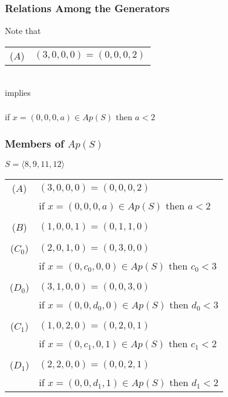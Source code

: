 \documentclass{beamer}
\begin{document}

\begin{frame}
\begin{center}
\frametitle{Relations Among the Generators}

Note that

{\footnotesize
\begin{center}
\begin{tabular}{cl}
($A$) & $\left(3, 0, 0, 0\right)=\left(0, 0, 0, 2\right)$\\
\end{tabular}
\end{center}
}

~\\

implies\\

~\\

if $x = \left(0, 0, 0, a\right) \in Ap(S)$ then $a < 2$

\end{center}
\end{frame}


\begin{frame}
\begin{center}
\frametitle{Members of $Ap(S)$}

$S = \langle 8, 9, 11, 12 \rangle$

{\footnotesize
\begin{center}
\begin{tabular}{cl}
($A$) & $\left(3, 0, 0, 0\right) = \left(0, 0, 0, 2\right)$\\
 & if $x = \left(0, 0, 0, a\right) \in Ap(S)$ then $a < 2$\\
 &\\
($B$) & $\left(1, 0, 0, 1\right) = \left(0, 1, 1, 0\right)$\\
 &\\
($C_0$) & $\left(2, 0, 1, 0\right) = \left(0, 3, 0, 0\right)$\\
 & if $x = \left(0, c_0, 0, 0\right) \in Ap(S)$ then $c_0 < 3$\\
 &\\
($D_0$) & $\left(3, 1, 0, 0\right) = \left(0, 0, 3, 0\right)$\\
 & if $x = \left(0, 0, d_0, 0\right) \in Ap(S)$ then $d_0 < 3$\\
 &\\
($C_1$) & $\left(1, 0, 2, 0\right) = \left(0, 2, 0, 1\right)$\\
 & if $x = \left(0, c_1, 0, 1\right) \in Ap(S)$ then $c_1 < 2$\\
 &\\
($D_1$) & $\left(2, 2, 0, 0\right) = \left(0, 0, 2, 1\right)$\\
 & if $x = \left(0, 0, d_1, 1\right) \in Ap(S)$ then $d_1 < 2$\\
\end{tabular}
\end{center}
}

\end{center}
\end{frame}
\end{document}
